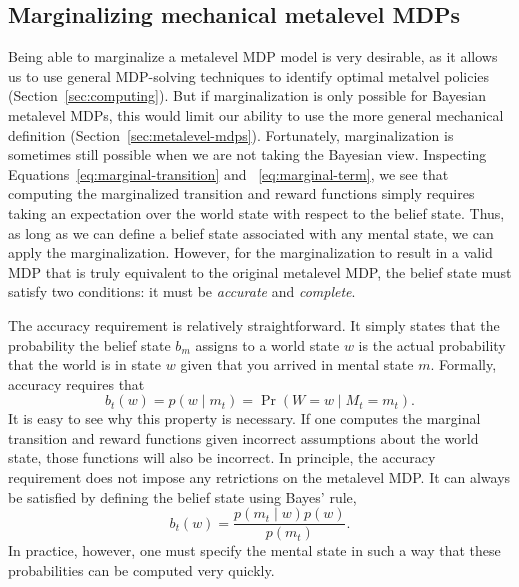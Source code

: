 \subsection{Marginalizing mechanical metalevel MDPs}\label{sec:marginal-mechanical}

Being able to marginalize a metalevel MDP model is very desirable, as it allows us to use general MDP-solving techniques to identify optimal metalvel policies (Section~\ref{sec:computing}). But if marginalization is only possible for Bayesian metalevel MDPs, this would limit our ability to use the more general mechanical definition (Section~\ref{sec:metalevel-mdps}). Fortunately, marginalization is sometimes still possible when we are not taking the Bayesian view. Inspecting Equations~\ref{eq:marginal-transition} and ~\ref{eq:marginal-term}, we see that computing the marginalized transition and reward functions simply requires taking an expectation over the world state with respect to the belief state. Thus, as long as we can define a belief state associated with any mental state, we can apply the marginalization. However, for the marginalization to result in a valid MDP that is truly equivalent to the original metalevel MDP, the belief state must satisfy two conditions: it must be \emph{accurate} and \emph{complete}.

The accuracy requirement is relatively straightforward. It simply states that the probability the belief state $b_m$ assigns to a world state $w$ is the actual probability that the world is in state $w$ given that you arrived in mental state $m$. Formally, accuracy requires that
\begin{equation}\label{eq:belief-accuracy}
  b_t(w) = p(w \mid m_t) = \Pr(W = w \mid M_t = m_t).
\end{equation}
It is easy to see why this property is necessary. If one computes the marginal transition and reward functions given incorrect assumptions about the world state, those functions will also be incorrect. In principle, the accuracy requirement does not impose any retrictions on the metalevel MDP. It can always be satisfied by defining the belief state using Bayes' rule,
\begin{equation}
  b_t(w) = \frac{p(m_t \mid w) p(w)}{p(m_t)}.
\end{equation}
In practice, however, one must specify the mental state in such a way that these probabilities can be computed very quickly.

